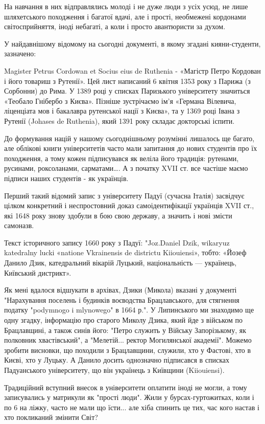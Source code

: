 На навчання в них відправлялись молоді і не дуже люди з усіх усюд, не лише
шляхетського походження і багатої вдачі, але і прості, необмежені кордонами
світосприйняття, іноді небагаті, а коли і просто авантюристи за духом. 

У найдавнішому відомому на сьогодні документі, в якому згадані кияни-студенти,
зазначено: 

Magister Petrus Cordowan et Socius eius de Ruthenia - «Магістр Петро Кордован і
його товариш з Рутенії». Цей лист написаний 6 квітня 1353 року з Парижа (з
Сорбонни) до Рима. У 1389 році у списках Паризького університету значиться
«Теобало Гнібербо з Києва». Пізніше зустрічаємо ім'я «Германа Вілевича,
ліценціата мов і бакалавра рутенської нації з Києва», та у 1369 році Івана з
Рутенії (Johases de Ruthenia), який 1391 року складає докторські іспити. 

До формування націй у нашому сьогоднішньому розумінні лишалось ще багато, але
облікові книги університетів часто мали запитання до нових студентів про їх
походження, а тому кожен підписувався як веліла його традиція: рутенами,
русинами, роксоланами, сарматами…. А з початку XVII ст. все частіше маємо
підписи наших студентів - як українців.

Перший такий відомий запис з університету Падуї (сучасна Італія) засвідчує
цілком конкретний і неспростовний доказ самоідентифікації українців XVII ст.,
які 1648 року знову здобули в бою свою державу, а значить і нові змісти
самоназв. 

Текст історичного запису 1660 року з Падуї: "Joz.Daniel Dzik, wikaryuz
katedralny lucki «natione Vkrainensis de districtu Kiiouiensi», тобто: «Йозеф
Данило Дзик, катедральний вікарій Луцький, національність — українець,
Київський дистрикт».

Як мені вдалося відшукати в архівах, Дзики (Микола) вказані у документі
"Нарахування поселень і будинків воєводства Брацлавського, для стягнення
податку "podymnogo i mlynowego" в 1664 р.". У Липинського ми знаходимо ще одну
згадку, інформацію про старого Миколу Дзика, який йде з військом по
Брацлавщині, а також синів його: "Петро служить у Війську Запорізькому, як
полковник хвастівський", а "Мелетій... ректор Могилянської академії". Можемо
зробити висновки, що походили з Брацлавщини, служили, хто у Фастові, хто в
Києві, хто у Луцьку. А Данило досить однозначно підписався в списках
Падуанського університету, що він українець з Київщини (Kiiouiensi). 

Традиційний вступний внесок в університети оплатити іноді не могли, а тому
записувались у матрикули як "прості люди". Жили у бурсах-гуртожитках, коли і по
6 на ліжку, часто не мали що їсти... але хіба спинить це тих, час кого настав і
хто покликаний змінити Світ?

